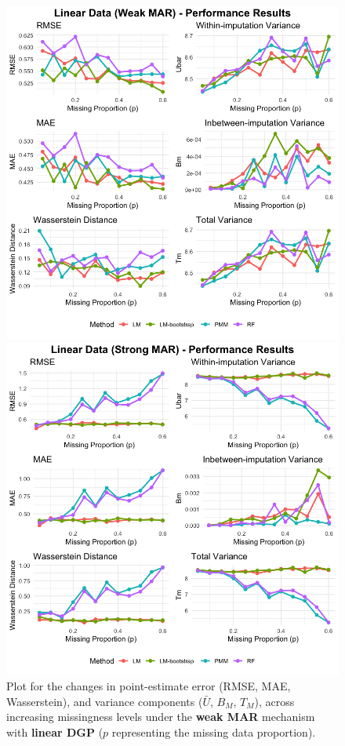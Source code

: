 \documentclass[12pt,oneside]{amsart}
\theoremstyle{definition}
\theoremstyle{remark}
\numberwithin{equation}{section}
\begin{document}
\begin{figure}[ht]
    \centering
    \begin{minipage}[b]{0.48\linewidth}
        \centering
        \includegraphics[width=\linewidth]{Report/Figure/result_linear_wmar.jpg}
        \caption{Plot for the changes in point-estimate error (RMSE, MAE, Wasserstein), and variance components ($\bar{U}$, $B_M$, $T_M$), across increasing missingness levels under the \textbf{weak MAR} mechanism with \textbf{linear DGP} ($p$ representing the missing data proportion).}
        \label{fig:result_linear_wmar}
    \end{minipage}
    \hfill
    \begin{minipage}[b]{0.48\linewidth}
        \centering
        \includegraphics[width=\linewidth]{Report/Figure/result_linear_mar.jpg}

\end{minipage}
\end{figure}
\end{document}

